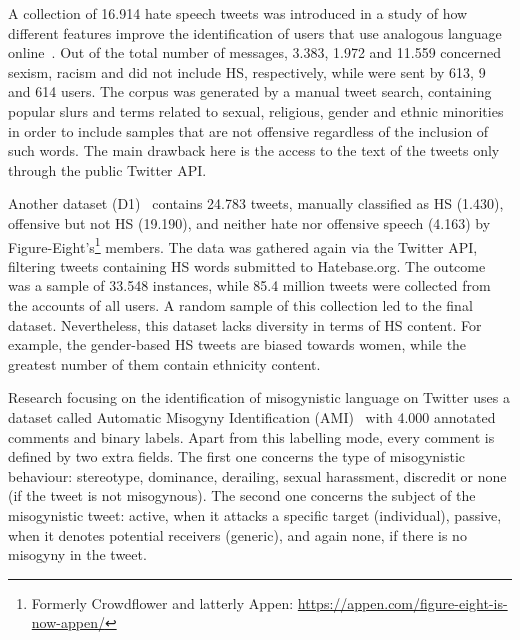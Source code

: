 \documentclass{article}
\begin{document}
A collection of 16.914 hate speech tweets was introduced in a study of how different features improve the identification of users that use analogous language online~\cite{waseem-hovy}. Out of the total number of messages, 3.383, 1.972 and 11.559 concerned sexism, racism and did not include HS, respectively, while were sent by 613, 9 and 614 users. The corpus was generated by a manual tweet search, containing popular slurs and terms related to sexual, religious, gender and ethnic minorities in order to include samples that are not offensive regardless of the inclusion of such words. The main drawback here is the access to the text of the tweets only through the public Twitter API.

Another dataset (D1)~\cite{hateTweets} contains 24.783 tweets, manually classified as HS (1.430), offensive but not HS (19.190), and neither hate nor offensive speech (4.163) by Figure-Eight's\footnote{Formerly Crowdflower and latterly Appen: \url{https://appen.com/figure-eight-is-now-appen/}} members. The data was gathered again via the Twitter API, filtering tweets containing HS words submitted to Hatebase.org. The outcome was a sample of 33.548 instances, while 85.4 million tweets were collected from the accounts of all users. A random sample of this collection led to the final dataset. Nevertheless, this dataset lacks diversity in terms of HS content. For example, the gender-based HS tweets are biased towards women, while the greatest number of them contain ethnicity content. 

Research focusing on the identification of misogynistic language on Twitter uses a dataset called Automatic Misogyny Identification (AMI)~\cite{fersini2018overview} with 4.000 annotated comments and binary labels. Apart from this labelling mode, every comment is defined by two extra fields. The first one concerns the type of misogynistic behaviour: stereotype, dominance, derailing, sexual harassment, discredit or none (if the tweet is not misogynous). The second one concerns the subject of the misogynistic tweet: active, when it attacks a specific target (individual), passive, when it denotes potential receivers (generic), and again none, if there is no misogyny in the tweet.
\end{document}
